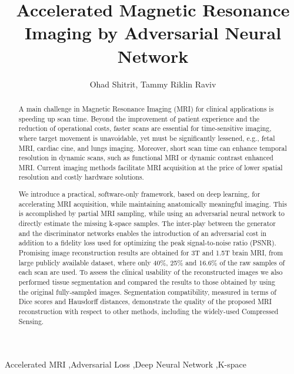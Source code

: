 \documentclass[review]{elsarticle}
\begin{document}
\begin{frontmatter}

\title{Accelerated Magnetic Resonance Imaging by Adversarial Neural Network}

\author{Ohad Shitrit, Tammy Riklin Raviv}
\address{$^1$Department of Electrical Engineering, 
	     $^2$The Zlotowski Center for Neuroscience
	     Ben-Gurion University of the Negev, Israel}

\begin{abstract}
A main challenge in Magnetic Resonance Imaging (MRI) for clinical applications is speeding up scan time. Beyond the improvement of patient experience and the reduction of operational costs, faster scans are essential for time-sensitive imaging, where target movement is unavoidable, yet must be significantly lessened, e.g., fetal MRI, cardiac cine, and lungs imaging. Moreover, short scan time can enhance temporal resolution in dynamic scans, such as functional MRI or dynamic contrast enhanced MRI. Current imaging methods facilitate MRI acquisition at the price of lower spatial resolution and costly hardware solutions.

We introduce a practical, software-only framework, based on deep learning, for accelerating MRI acquisition, while maintaining anatomically meaningful imaging. This is accomplished by partial MRI sampling, while using an adversarial neural network to directly estimate the missing k-space samples. The inter-play between the generator and the discriminator networks enables the introduction of an adversarial cost in addition to a fidelity loss used for optimizing the peak signal-to-noise ratio (PSNR). Promising image reconstruction results are obtained for 3T and 1.5T brain MRI, from large publicly available dataset, where only 40\%, 25\% and 16.6\% of the raw samples of each scan are used. To assess the clinical usability of the reconstructed images we also performed tissue segmentation and compared the results to those obtained by using the original fully-sampled images.
Segmentation compatibility, measured in terms of Dice scores and Hausdorff distances, demonstrate the quality of the proposed MRI reconstruction with respect to other methods, including the widely-used Compressed Sensing.

\end{abstract}

\begin{keyword}
\text Accelerated MRI \sep Adversarial Loss \sep Deep Neural Network \sep K-space
\end{keyword}

\end{frontmatter}
\end{document}

